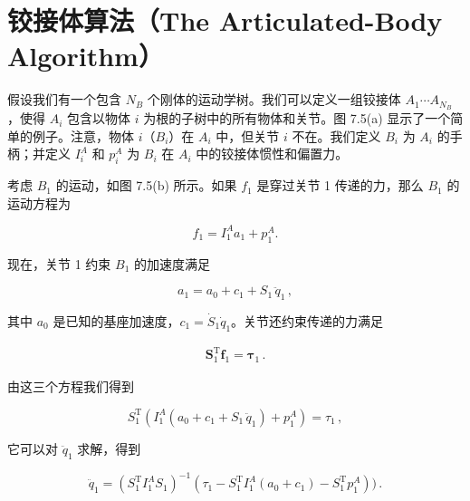 \documentclass[10pt,a4paper]{book}
\theoremstyle{thmstyle} %
\theoremstyle{defstyle} %
\theoremstyle{prostyle} %
\begin{document}
\section{铰接体算法（The Articulated-Body Algorithm）}





假设我们有一个包含 $N_B$ 个刚体的运动学树。我们可以定义一组铰接体 $A_1 \cdots A_{N_B}$，使得 $A_i$ 包含以物体 $i$ 为根的子树中的所有物体和关节。图 7.5(a) 显示了一个简单的例子。注意，物体 $i$（$B_i$）在 $A_i$ 中，但关节 $i$ 不在。我们定义 $B_i$ 为 $A_i$ 的手柄；并定义 $I_i^A$ 和 $p_i^A$ 为 $B_i$ 在 $A_i$ 中的铰接体惯性和偏置力。



考虑 $B_{1}$ 的运动，如图 7.5(b) 所示。如果 $f_{1}$ 是穿过关节 1 传递的力，那么 $B_{1}$ 的运动方程为



$$
f _ { 1 } = I _ { 1 } ^{A} a _ { 1 } + p _ { 1 } ^{A} .
$$



现在，关节 1 约束 $B_{1}$ 的加速度满足



$$
a _ { 1 } = a _ { 0 } + c _ { 1 } + S _ { 1 } \, \ddot { q } _ { 1 } \, ,
$$



其中 $a_{0}$ 是已知的基座加速度，$c_{1}=\dot{S}_{1}\dot{q}_{1}$。关节还约束传递的力满足



$$
\begin{array}{r} { \boldsymbol { S } _ { 1 } ^{\mathrm { T} } \boldsymbol { f } _ { 1 } = \boldsymbol { \tau } _ { 1 } \, . } \end{array}
$$



由这三个方程我们得到



$$
S _ { 1 } ^{\mathrm { T} } ( I _ { 1 } ^{A} ( a _ { 0 } + c _ { 1 } + S _ { 1 } \, \ddot { q } _ { 1 } ) + p _ { 1 } ^{A} ) = \tau _ { 1 } \, ,
$$



它可以对 $\ddot{q}_{1}$ 求解，得到



$$
\ddot { q } _ { 1 } = \left( S _ { 1 } ^{\mathrm { T} } I _ { 1 } ^{A} S _ { 1 } \right) ^{- 1} ( \tau _ { 1 } - S _ { 1 } ^{\mathrm { T} } I _ { 1 } ^{A} ( a _ { 0 } + c _ { 1 } ) - S _ { 1 } ^{\mathrm { T} } p _ { 1 } ^{A} ) ) \, .
$$
\end{document}
